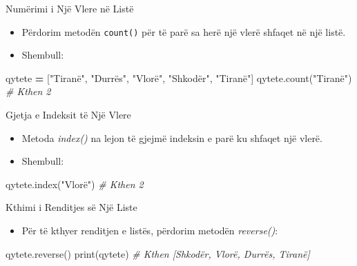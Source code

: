 \documentclass[
  ignorenonframetext,
]{beamer}
\newenvironment{Shaded}{\begin{snugshade}}{\end{snugshade}}
\newcommand{\BuiltInTok}[1]{#1}
\newcommand{\CommentTok}[1]{\textcolor[rgb]{0.56,0.35,0.01}{\textit{#1}}}
\newcommand{\NormalTok}[1]{#1}
\newcommand{\OperatorTok}[1]{\textcolor[rgb]{0.81,0.36,0.00}{\textbf{#1}}}
\newcommand{\StringTok}[1]{\textcolor[rgb]{0.31,0.60,0.02}{#1}}
\providecommand{\tightlist}{%
  \setlength{\itemsep}{0pt}\setlength{\parskip}{0pt}}
\begin{document}
\begin{frame}[fragile]{Numërimi i Një Vlere në Listë}
\protect\hypertarget{numuxebrimi-i-njuxeb-vlere-nuxeb-listuxeb}{}
\begin{itemize}
\item
  Përdorim metodën \texttt{count()} për të parë sa herë një vlerë
  shfaqet në një listë.
\item
  Shembull:
\end{itemize}

\begin{Shaded}
\begin{Highlighting}[]
\NormalTok{  qytete }\OperatorTok{=}\NormalTok{ [}\StringTok{"Tiranë"}\NormalTok{, }\StringTok{"Durrës"}\NormalTok{, }\StringTok{"Vlorë"}\NormalTok{, }\StringTok{"Shkodër"}\NormalTok{, }\StringTok{"Tiranë"}\NormalTok{]}
\NormalTok{  qytete.count(}\StringTok{"Tiranë"}\NormalTok{)  }\CommentTok{\# Kthen 2}
\end{Highlighting}
\end{Shaded}
\end{frame}

\begin{frame}[fragile]{Gjetja e Indeksit të Një Vlere}
\protect\hypertarget{gjetja-e-indeksit-tuxeb-njuxeb-vlere}{}
\begin{itemize}
\item
  Metoda \emph{index()} na lejon të gjejmë indeksin e parë ku shfaqet
  një vlerë.
\item
  Shembull:
\end{itemize}

\begin{Shaded}
\begin{Highlighting}[]
\NormalTok{qytete.index(}\StringTok{"Vlorë"}\NormalTok{)  }\CommentTok{\# Kthen 2}
\end{Highlighting}
\end{Shaded}
\end{frame}

\begin{frame}[fragile]{Kthimi i Renditjes së Një Liste}
\protect\hypertarget{kthimi-i-renditjes-suxeb-njuxeb-liste}{}
\begin{itemize}
\tightlist
\item
  Për të kthyer renditjen e listës, përdorim metodën \emph{reverse()}:
\end{itemize}

\begin{Shaded}
\begin{Highlighting}[]
\NormalTok{qytete.reverse()}
\BuiltInTok{print}\NormalTok{(qytete)  }\CommentTok{\# Kthen [\textquotesingle{}Shkodër\textquotesingle{}, \textquotesingle{}Vlorë\textquotesingle{}, \textquotesingle{}Durrës\textquotesingle{}, \textquotesingle{}Tiranë\textquotesingle{}]}
\end{Highlighting}
\end{Shaded}
\end{frame}
\end{document}
